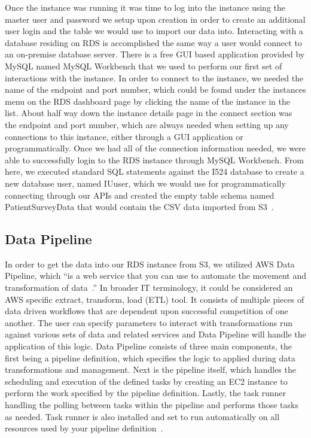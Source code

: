 Once the instance was running it was time to log into the instance using the 
master user and password we setup upon creation in order to create an 
additional user login and the table we would use to import our data into. 
Interacting with a database residing on RDS is accomplished the same way a 
user would connect to an on-premise database server. There is a free GUI based 
application provided by MySQL named MySQL Workbench that we used to perform 
our first set of interactions with the instance. In order to connect to the 
instance, we needed the name of the endpoint and port number, which could be 
found under the instances menu on the RDS dashboard page by clicking the name 
of the instance in the list. About half way down the instance details page in 
the connect section was the endpoint and port number, which are always needed 
when setting up any connections to this instance, either through a GUI 
application or programmatically. Once we had all of the connection information 
needed, we were able to successfully login to the RDS instance through MySQL 
Workbench. From here, we executed standard SQL statements against the I524 
database to create a new database user, named IUuser, which we would use for 
programmatically connecting through our APIs and created the empty table 
schema named PatientSurveyData that would contain the CSV data imported 
from S3~\cite{hid-sp18-521-rds-mysql}. 

\subsection{Data Pipeline}

In order to get the data into our RDS instance from S3, we utilized AWS Data 
Pipeline, which ``is a web service that you can use to automate the movement 
and transformation of data~\cite{hid-sp18-521-whatisdatapipeline}.'' In 
broader IT terminology, it could be considered an AWS specific extract, 
transform, load (ETL) tool. It consists of multiple pieces of data driven 
workflows that are dependent upon successful competition of one another. 
The user can specify parameters to interact with transformations run against 
various sets of data and related services and Data Pipeline will handle the 
application of this logic. Data Pipeline consists of three main components, 
the first being a pipeline definition, which specifies the logic to applied 
during data transformations and management. Next is the pipeline itself, which 
handles the scheduling and execution of the defined tasks by creating an EC2 
instance to perform the work specified by the pipeline definition. Lastly, 
the task runner handling the polling between tasks within the pipeline and 
performs those tasks as needed. Task runner is also installed and set to run 
automatically on all resources used by your pipeline 
definition~\cite{hid-sp18-521-whatisdatapipeline}. 

